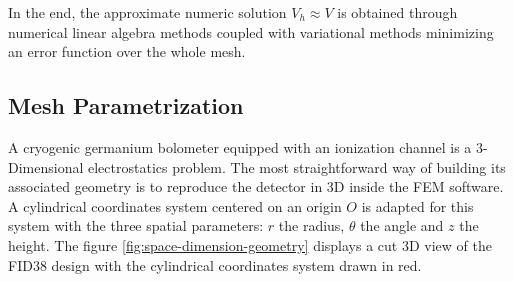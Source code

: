 %

In the end, the approximate numeric solution $V_h \approx V$ is obtained through numerical linear algebra methods coupled with variational methods minimizing an error function over the whole mesh.



\subsection{Mesh Parametrization}
\label{par:mesh-parametrization}
\label{par:mesh-scale}

A cryogenic germanium bolometer equipped with an ionization channel is a 3-Dimensional electrostatics problem. The most straightforward way of building its associated geometry is to reproduce the detector in 3D inside the FEM software. A cylindrical coordinates system centered on an origin $O$ is adapted for this system with the three spatial parameters: $r$ the radius, $\theta$ the angle and $z$ the height. The figure \ref{fig:space-dimension-geometry} displays a cut 3D view of the FID38 design with the cylindrical coordinates system drawn in red. 

